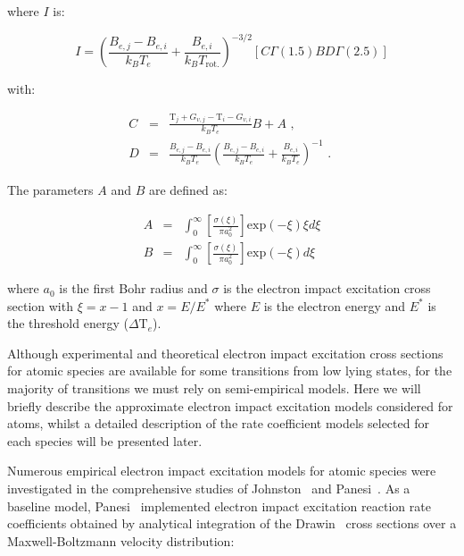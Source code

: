 \noindent where $I$	 is:

\begin{equation}
 I = \left ( \frac{B_{e,j} - B_{e,i}}{k_B T_e} + \frac{B_{e,i}}{k_B T_\text{rot.}} \right )^{-3/2} \left [ C \Gamma(1.5) B D \Gamma(2.5) \right ]
\end{equation}

with:

\begin{eqnarray}
 C &=& \frac{\mathrm{T}_j + G_{v,j} - \mathrm{T}_i - G_{v,i} }{k_B T_e} B + A \text{ , } \\
 D &=& \frac{B_{e,j} - B_{e,i}}{k_B T_e} \left ( \frac{B_{e,j} - B_{e,i}}{k_B T_e} + \frac{B_{e,i}}{k_B T_e} \right )^{-1} \text{ . }
\end{eqnarray}

\noindent The parameters $A$ and $B$ are defined as:

\begin{eqnarray}
 A &=& \int_0^\infty \left [ \frac{\sigma(\xi)}{\pi a_0^2} \right ] \text{exp} ( -\xi ) \xi d \xi \\
 B &=& \int_0^\infty \left [ \frac{\sigma(\xi)}{\pi a_0^2} \right ] \text{exp} ( -\xi ) d \xi  \label{eq:without}
\end{eqnarray}

\noindent where $a_0$ is the first Bohr radius and $\sigma$ is the electron impact excitation cross section with $\xi = x -1$ and $x = E / E^\ast$ where $E$ is the electron energy and $E^\ast$ is the threshold energy ($\Delta \mathrm{T}_e$).

\par

Although experimental and theoretical electron impact excitation cross sections for atomic species are available for some transitions from low lying states, for the majority of transitions we must rely on semi-empirical models.
Here we will briefly describe the approximate electron impact excitation models considered for atoms, whilst a detailed description of the rate coefficient models selected for each species will be presented later.

\par

Numerous empirical electron impact excitation models for atomic species were investigated in the comprehensive studies of Johnston~\cite{JohnPhd} and Panesi~\cite{panesi_phd}.
As a baseline model, Panesi~\cite{panesi_phd} implemented electron impact excitation reaction rate coefficients obtained by analytical integration of the Drawin~\cite{drawin_1968} cross sections over a Maxwell-Boltzmann velocity distribution:

